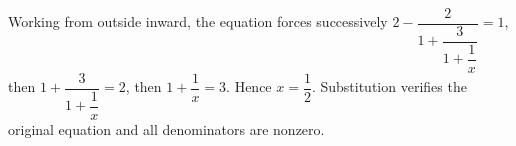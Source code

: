 Working from outside inward, the equation forces successively $2-\dfrac{2}{1+\dfrac{3}{1+\dfrac{1}{x}}}=1$, then $1+\dfrac{3}{1+\dfrac{1}{x}}=2$, then $1+\dfrac{1}{x}=3$. Hence $\boxed{x=\dfrac{1}{2}}$. Substitution verifies the original equation and all denominators are nonzero.
